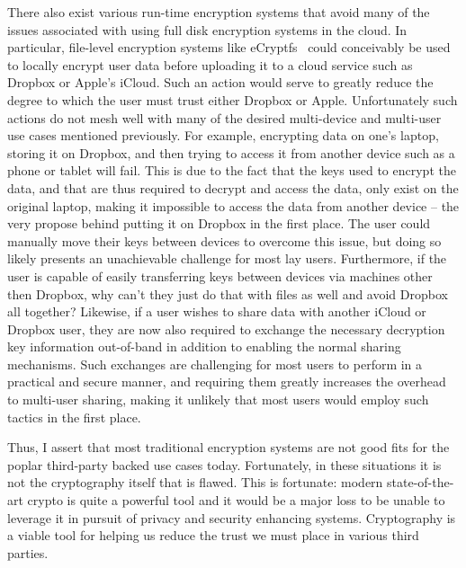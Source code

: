 There also exist various run-time encryption systems that avoid many
of the issues associated with using full disk encryption systems in
the cloud. In particular, file-level encryption systems like
eCryptfs~\cite{ecryptfs} could conceivably be used to locally encrypt
user data before uploading it to a cloud service such as Dropbox or
Apple's iCloud. Such an action would serve to greatly reduce the
degree to which the user must trust either Dropbox or
Apple. Unfortunately such actions do not mesh well with many of the
desired multi-device and multi-user use cases mentioned
previously. For example, encrypting data on one's laptop, storing it
on Dropbox, and then trying to access it from another device such as a
phone or tablet will fail. This is due to the fact that the keys used
to encrypt the data, and that are thus required to decrypt and access
the data, only exist on the original laptop, making it impossible to
access the data from another device -- the very propose behind putting
it on Dropbox in the first place. The user could manually move their
keys between devices to overcome this issue, but doing so likely
presents an unachievable challenge for most lay users. Furthermore, if
the user is capable of easily transferring keys between devices via
machines other then Dropbox, why can't they just do that with files as
well and avoid Dropbox all together? Likewise, if a user wishes to
share data with another iCloud or Dropbox user, they are now also
required to exchange the necessary decryption key information
out-of-band in addition to enabling the normal sharing
mechanisms. Such exchanges are challenging for most users to perform
in a practical and secure manner, and requiring them greatly increases
the overhead to multi-user sharing, making it unlikely that most users
would employ such tactics in the first place.

Thus, I assert that most traditional encryption systems are not good
fits for the poplar third-party backed use cases today. Fortunately,
in these situations it is not the cryptography itself that is
flawed. This is fortunate: modern state-of-the-art crypto is quite a
powerful tool and it would be a major loss to be unable to leverage it
in pursuit of privacy and security enhancing systems. Cryptography is
a viable tool for helping us reduce the trust we must place in various
third parties.

